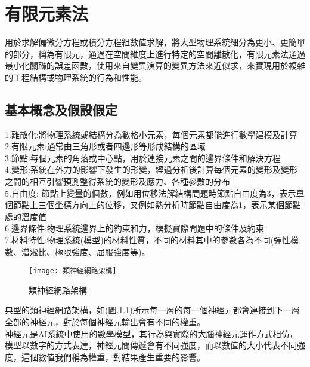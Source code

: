 \chapter{有限元素法}
用於求解偏微分方程或積分方程組數值求解，將大型物理系統細分為更小、更簡單的部分，稱為有限元，通過在空間維度上進行特定的空間離散化，有限元素法通過最小化關聯的誤差函數，使用來自變異演算的變異方法來近似求，來實現用於複雜的工程結構或物理系統的行為和性能。\\

\section{基本概念及假設假定}
1.離散化:將物理系統或結構分為數格小元素，每個元素都能進行數學建模及計算\\
2.有限元素:通常由三角形或者四邊形等形成結構的區域\\
3.節點:每個元素的角落或中心點，用於連接元素之間的邊界條件和解決方程\\
4.變形:系統在外力的影響下發生的形變，經過分析後計算每個元素的變形及變形之間的相互引響預測整得系統的變形及應力、各種參數的分布\\
5.自由度: 節點上變量的個數，例如用位移法解結構問題時節點自由度為3，表示單個節點上三個坐標方向上的位移，又例如熱分析時節點自由度為1，表示某個節點處的溫度值\\
6.邊界條件:物理系統邊界上的約束和力，模擬實際問題中的條件及約束\\
7.材料特性:物理系統(模型)的材料性質，不同的材料其中的參數各為不同(彈性模數、潽淞比、極限強度、屈服強度等)。\\

\begin{figure}[hbt!]
\begin{center}
\texttt{[image: 類神經網路架構]}
\caption{\Large 類神經網路架構}\label{類神經網路架構}
\end{center}
\end{figure}

 典型的類神經網路架構，如(圖.\ref{類神經網路架構})所示每一層的每一個神經元都會連接到下一層全部的神經元，對於每個神經元輸出會有不同的權重。\\

 神經元是AI系統中使用的數學模型，其行為與實際的大腦神經元運作方式相仿，模型以數字的方式表達，神經元間傳遞會有不同強度，而以數值的大小代表不同強度，這個數值我們稱為權重，對結果產生重要的影響。\\

